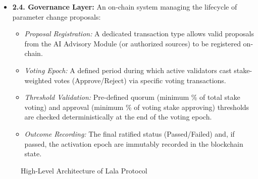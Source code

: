 \documentclass[11pt]{article}
\begin{document}
\begin{itemize}
    \item \textbf{2.4. Governance Layer:} An on-chain system managing the lifecycle of parameter change proposals:
        \begin{itemize}
            \item \textit{Proposal Registration:} A dedicated transaction type allows valid proposals from the AI Advisory Module (or authorized sources) to be registered on-chain.
            \item \textit{Voting Epoch:} A defined period during which active validators cast stake-weighted votes (Approve/Reject) via specific voting transactions.
            \item \textit{Threshold Validation:} Pre-defined quorum (minimum \% of total stake voting) and approval (minimum \% of voting stake approving) thresholds are checked deterministically at the end of the voting epoch.
            \item \textit{Outcome Recording:} The final ratified status (Passed/Failed) and, if passed, the activation epoch are immutably recorded in the blockchain state.
        \end{itemize}
\end{itemize}

\begin{figure}[htbp] 
    \centering
    \caption{High-Level Architecture of Lala Protocol} 
    \label{fig:architecture} 
\end{figure}
\end{document}
